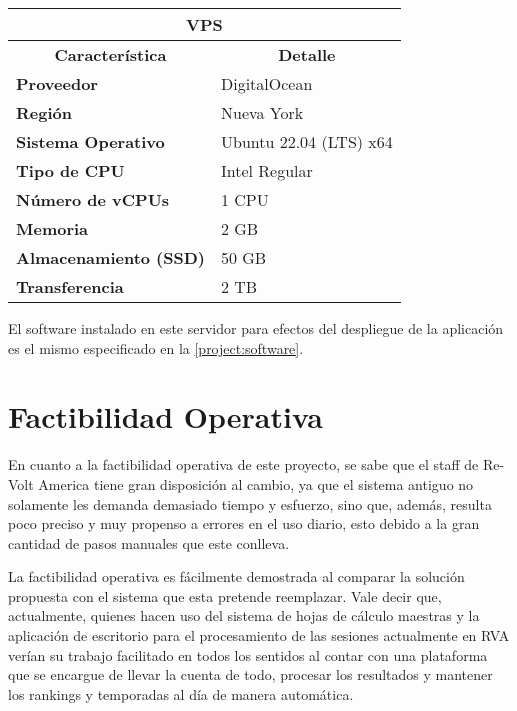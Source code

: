 \begin{center}
	\begin{tabular}{ | l | p{10cm} |}
		\hline
		\multicolumn{2}{|c|}{\textbf{VPS}} \\
		\hline
		\multicolumn{1}{|c|}{\textbf{Característica}} & \multicolumn{1}{|c|}{\textbf{Detalle}} \\
		\hline
		
		{\textbf{Proveedor}} & DigitalOcean \\ \hline
		
		{\textbf{Región}} & Nueva York \\ \hline
		
		{\textbf{Sistema Operativo}} & Ubuntu 22.04 (LTS) x64 \\ \hline
		
		{\textbf{Tipo de CPU}} & Intel Regular \\ \hline
		
		{\textbf{Número de vCPUs}} & 1 CPU\\ \hline
		
		{\textbf{Memoria}} & 2 GB \\ \hline
		
		{\textbf{Almacenamiento (SSD)}} & 50 GB \\ \hline
		
		{\textbf{Transferencia}} & 2 TB \\ \hline
	\end{tabular}
\end{center}

El software instalado en este servidor para efectos del despliegue de la aplicación es el mismo especificado en la \autoref{project:software}.

\section{Factibilidad Operativa}
En cuanto a la factibilidad operativa de este proyecto, se sabe que el staff de Re-Volt America tiene gran disposición al cambio, ya que el sistema antiguo no solamente les demanda demasiado tiempo y esfuerzo, sino que, además, resulta poco preciso y muy propenso a errores en el uso diario, esto debido a la gran cantidad de pasos manuales que este conlleva.

La factibilidad operativa es fácilmente demostrada al comparar la solución propuesta con el sistema que esta pretende reemplazar. Vale decir que, actualmente, quienes hacen uso del sistema de hojas de cálculo maestras y la aplicación de escritorio para el procesamiento de las sesiones actualmente en RVA verían su trabajo facilitado en todos los sentidos al contar con una plataforma que se encargue de llevar la cuenta de todo, procesar los resultados y mantener los rankings y temporadas al día de manera automática.

